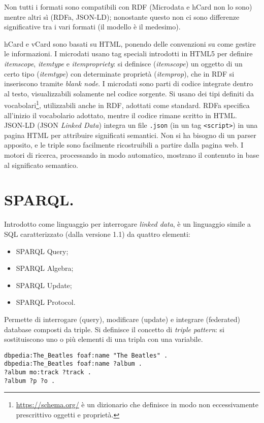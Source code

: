 \documentclass[11pt]{article}
\begin{document}
\begin{multicols}{2}
Non tutti i formati sono compatibili con RDF (Microdata e hCard non lo sono) mentre altri sì (RDFa, JSON-LD); nonostante questo non ci sono differenze significative tra i vari formati (il modello è il medesimo).

hCard e vCard sono basati su HTML, ponendo delle convenzioni su come gestire le informazioni. \newline
I microdati usano tag speciali introdotti in HTML5 per definire \textit{itemscope}, \textit{itemtype} e \textit{itempropriety}: si definisce (\textit{itemscope}) un oggetto di un certo tipo (\textit{itemtype}) con determinate proprietà (\textit{itemprop}), che in RDF si inseriscono tramite \textit{blank node}.
I microdati sono parti di codice integrate dentro al testo, visualizzabili solamente nel codice sorgente.
Si usano dei tipi definiti da vocabolari\footnote{\url{https://schema.org/} è un dizionario che definisce in modo non eccessivamente prescrittivo oggetti e proprietà.}, utilizzabili anche in RDF, adottati come standard. \newline
RDFa specifica all'inizio il vocabolario adottato, mentre il codice rimane scritto in HTML. \newline
JSON-LD (JSON \textit{Linked Data}) integra un file \verb|.json| (in un tag \verb|<script>|) in una pagina HTML per attribuire significati semantici.
Non si ha bisogno di un parser apposito, e le triple sono facilmente ricostruibili a partire dalla pagina web.
I motori di ricerca, processando in modo automatico, mostrano il contenuto in base al significato semantico.

\section{SPARQL.}
Introdotto come linguaggio per interrogare \textit{linked data}, è un linguaggio simile a SQL caratterizzato (dalla versione 1.1) da quattro elementi:
\begin{itemize}
  \item SPARQL Query;
  \item SPARQL Algebra;
  \item SPARQL Update;
  \item SPARQL Protocol.
\end{itemize}
Permette di interrogare (query), modificare (update) e integrare (federated) database composti da triple.
Si definisce il concetto di \textit{triple pattern}: si sostituiscono uno o più elementi di una tripla con una variabile.
\end{multicols}
\begin{verbatim}
dbpedia:The_Beatles foaf:name "The Beatles" .
dbpedia:The_Beatles foaf:name ?album .
?album mo:track ?track .
?album ?p ?o .
\end{verbatim}
\end{document}
